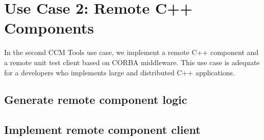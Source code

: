 \section{Use Case 2: Remote C++ Components}
\label{section:RemoteC++ComponentImplementation}

In the second CCM Tools use case, we implement a remote C++ component and a
remote unit test client based on CORBA middleware. 
This use case is adequate for a developers who implements large and distributed
C++ applications.


\subsection{Generate remote component logic}
\label{subsection:GenerateRemoteComponentLogic}


\subsection{Implement remote component client}
\label{subsection:ImplementRemoteComponentClient}


\newpage